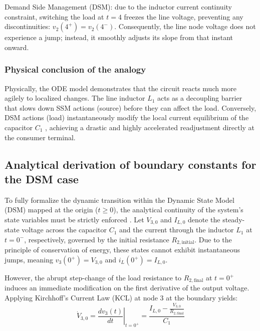 \documentclass[11pt, a4paper]{article}
\begin{document}
\medskip
Demand Side Management (DSM): due to the inductor current continuity
constraint, switching the load at $t = 4$ freezes the line voltage, preventing
any discontinuities: $v_2 (4^+) = v_2(4^-)$. Consequently, the line node voltage
does not experience a jump; instead, it smoothly adjusts its slope from that
instant onward.

\subsubsection*{Physical conclusion of the analogy}

Physically, the ODE model demonstrates that the circuit reacts much more agilely
to localized changes. The line inductor $L_1$ acts as a decoupling barrier that slows down SSM actions (source) before they can affect the load. Conversely, DSM actions (load) instantaneously modify the local current equilibrium of the capacitor $C_1$ , achieving a drastic and highly accelerated readjustment directly at the consumer terminal.




\subsection{Analytical derivation of boundary constants for the DSM case}

To fully formalize the dynamic transition within the Dynamic State Model (DSM) mapped at the origin ($t \ge 0$), the analytical continuity of the system's state variables must be strictly enforced \cite{biom11020343}. Let $V_{3,0}$ and $I_{L,0}$ denote the steady-state voltage across the capacitor $C_1$ and the current through the inductor $L_1$ at $t=0^-$, respectively, governed by the initial resistance $R_{2,\text{initial}}$. Due to the principle of conservation of energy, these states cannot exhibit instantaneous jumps, meaning $v_3(0^+) = V_{3,0}$ and $i_L(0^+) = I_{L,0}$.

However, the abrupt step-change of the load resistance to $R_{2,\text{final}}$ at $t=0^+$ induces an immediate modification on the first derivative of the output voltage. Applying Kirchhoff's Current Law (KCL) at node 3 at the boundary yields:
\begin{equation}
    \dot{V}_{3,0} = \left.\frac{dv_3(t)}{dt}\right|_{t=0^+} = \frac{I_{L,0} - \frac{V_{3,0}}{R_{2,\text{final}}}}{C_1}
\end{equation}
\end{document}
